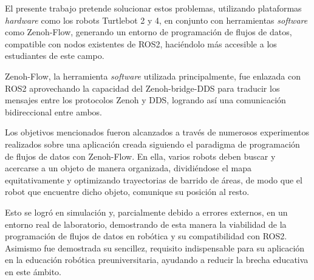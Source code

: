 El presente trabajo pretende solucionar estos problemas, utilizando plataformas
\textit{hardware} como los robots Turtlebot 2 y 4, en conjunto con herramientas
\textit{software} como Zenoh-Flow, generando un entorno de programación de
flujos de datos, compatible con nodos existentes de ROS2, haciéndolo más
accesible a los estudiantes de este campo.

Zenoh-Flow, la herramienta \textit{software} utilizada principalmente, fue
enlazada con ROS2 aprovechando la capacidad del Zenoh-bridge-DDS para
traducir los mensajes entre los protocolos Zenoh y DDS, logrando así una
comunicación bidireccional entre ambos.

Los objetivos mencionados fueron alcanzados a través de numerosos experimentos
realizados sobre una aplicación creada siguiendo el paradigma de programación de
flujos de datos con Zenoh-Flow.
En ella, varios robots deben buscar y acercarse a un objeto de manera
organizada, dividiéndose el mapa equitativamente y optimizando trayectorias de
barrido de áreas, de modo que el robot que encuentre dicho objeto, comunique su
posición al resto.

Esto se logró en simulación y, parcialmente debido a errores externos, en un
entorno real de laboratorio, demostrando de esta manera la viabilidad de la
programación de flujos de datos en robótica y su compatibilidad con ROS2.
Asimismo fue demostrada su sencillez, requisito indispensable para su aplicación
en la educación robótica preuniversitaria, ayudando a reducir la brecha
educativa en este ámbito.

